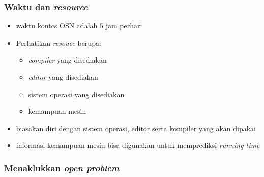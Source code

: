 \begin{frame}
	\frametitle{Waktu dan \textit{resource}}
	\begin{itemize}
		\item waktu kontes OSN adalah 5 jam perhari
		\item Perhatikan \textit{resouce} berupa:
		\begin{itemize}
			\item \textit{compiler} yang disediakan
			\item \textit{editor} yang disediakan
			\item sistem operasi yang disediakan
			\item kemampuan mesin
		\end{itemize}
		\item biasakan diri dengan sistem operasi, editor serta kompiler yang akan dipakai
		\item informasi kemampuan mesin bisa digunakan untuk memprediksi \textit{running time}
	\end{itemize}
\end{frame}

\begin{frame}
	\frametitle{Menaklukkan \textit{open problem}}

\end{frame}

